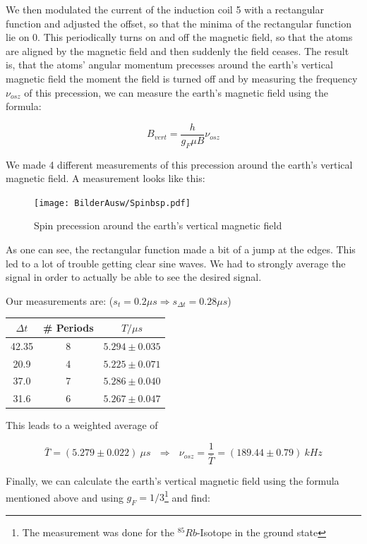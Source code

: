 We then modulated the current of the induction coil 5 with a rectangular function and adjusted the offset, so that the minima of the rectangular function lie on 0. This periodically turns on and off the magnetic field, so that the atoms are aligned by the magnetic field and then suddenly the field ceases. The result is, that the atoms' angular momentum precesses around the earth's vertical magnetic field the moment the field is turned off and by measuring the frequency $\nu_{osz}$ of this precession, we can measure the earth's magnetic field using the formula:

$$ B_{vert} = \frac{h}{g_F\mu B}\nu_{osz} $$

We made 4 different measurements of this precession around the earth's vertical magnetic field. A measurement looks like this:

\begin{figure}[H]
\centering \texttt{[image: BilderAusw/Spinbsp.pdf]}
\caption{Spin precession around the earth's vertical magnetic field}
\end{figure}

As one can see, the rectangular function made a bit of a jump at the edges. This led to a lot of trouble getting clear sine waves. We had to strongly average the signal in order to actually be able to see the desired signal.

Our measurements are: ($s_t = 0.2 \mu s \Rightarrow s_{\Delta t} = 0.28 \mu s$)

\begin{center}
\begin{tabular}[H]{c c c}
$\Delta t$ & \# Periods & $T/\mu s$\\ \hline
42.35 & 8 & $5.294 \pm 0.035$\\
20.9   & 4 & $5.225 \pm 0.071$\\
37.0   & 7 & $5.286 \pm  0.040$\\
31.6   & 6 & $5.267 \pm  0.047$\\
\end{tabular}
\end{center}

This leads to a weighted average of

$$ \bar T = (5.279 \pm 0.022)\ \mu s \ \ \ \Rightarrow \ \ \ \nu_{osz}=\frac{1}{\bar T}= (189.44 \pm 0.79)\ kHz$$

Finally, we can calculate the earth's vertical magnetic field using the formula mentioned above and using $g_F = 1/3$\footnote{The measurement was done for the $^{85}Rb$-Isotope in the ground state} and find:

